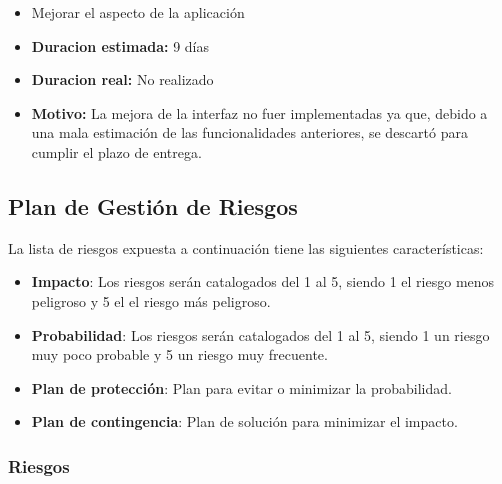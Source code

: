 \documentclass[openright,twoside,10pt]{book}
\providecommand{\tightlist}{%
  \setlength{\itemsep}{0pt}\setlength{\parskip}{0pt}}
\begin{document}
\begin{itemize}
      \begin{itemize}
      \tightlist
      \item
        Mejorar el aspecto de la aplicación
      \item
        \textbf{Duracion estimada:} 9 días
      \item
        \textbf{Duracion real:} No realizado
      \item
        \textbf{Motivo:} La mejora de la interfaz no fuer implementadas ya
        que, debido a una mala estimación de las funcionalidades anteriores,
        se descartó para cumplir el plazo de entrega.
      \end{itemize}
    \end{itemize}
    
    \newpage
    
    \subsection{Plan de Gestión de
    Riesgos}\label{plan-de-gestiuxf3n-de-riesgos}
    
    La lista de riesgos expuesta a continuación tiene las siguientes
    características:
    
    \begin{itemize}
    \item
      \textbf{Impacto}: Los riesgos serán catalogados del 1 al 5, siendo 1
      el riesgo menos peligroso y 5 el el riesgo más peligroso.
    \item
      \textbf{Probabilidad}: Los riesgos serán catalogados del 1 al 5,
      siendo 1 un riesgo muy poco probable y 5 un riesgo muy frecuente.
    \item
      \textbf{Plan de protección}: Plan para evitar o minimizar la
      probabilidad.
    \item
      \textbf{Plan de contingencia}: Plan de solución para minimizar el
      impacto.
    \end{itemize}
    
    \subsubsection{Riesgos}\label{riesgos}
    
\end{document}

